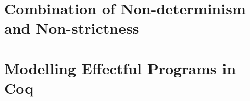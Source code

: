 %

\section{Combination of Non-determinism and Non-strictness}

\section{Modelling Effectful Programs in Coq}